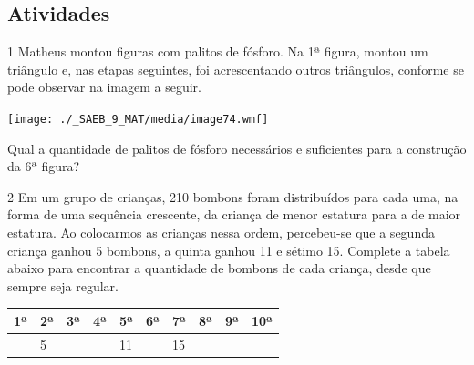 \begin{escolha}
\begin{boxmedio}
\begin{boxmedio}
{\begin{boxpeq}
\begin{boxpeq}
{\begin{boxpeq}
\begin{boxmedio}
\begin{boxmedio}
\begin{boxpeq}
\begin{boxmedio}
\begin{boxpeq}
\begin{boxpeq}
\begin{boxpeq}
\begin{boxpeq}
\begin{boxmedio}
{\begin{boxmedio}
\begin{boxmedio}
\begin{boxpeq}
\begin{boxmedio}
\begin{boxpeq}
\begin{boxpeq}
\begin{boxpeq}
\begin{escolha}
\section{Atividades}

\num{1} Matheus montou figuras com palitos de fósforo. Na 1ª figura, montou
um triângulo e, nas etapas seguintes, foi acrescentando outros triângulos,
conforme se pode observar na imagem a seguir.

\texttt{[image: ./\_SAEB\_9\_MAT/media/image74.wmf]}

Qual a quantidade de palitos de fósforo necessários e suficientes para a
construção da 6ª figura?



\num{2} Em um grupo de crianças, 210 bombons foram distribuídos
para cada uma, na forma de uma sequência crescente, da criança de menor
estatura para a de maior estatura. Ao colocarmos as crianças nessa
ordem, percebeu-se que a segunda criança ganhou 5 bombons, a quinta
ganhou 11 e sétimo 15. Complete a tabela abaixo para encontrar a
quantidade de bombons de cada criança, desde que sempre seja regular.

\begin{table}[]
\begin{tabular}{|l|l|l|l|l|l|l|l|l|l|}
\hline
\rowcolor[HTML]{CBCEFB} 
1ª & 2ª & 3ª & 4ª & 5ª & 6ª & 7ª & 8ª & 9ª & 10ª \\ \hline
 & 5 &  &  & 11 &  & 15 &  &  &  \\ \hline
\end{tabular}
\end{table}


\end{escolha}
\end{boxpeq}
\end{boxpeq}
\end{boxpeq}
\end{boxmedio}
\end{boxpeq}
\end{boxmedio}
\end{boxmedio}}
\end{boxmedio}
\end{boxpeq}
\end{boxpeq}
\end{boxpeq}
\end{boxpeq}
\end{boxmedio}
\end{boxpeq}
\end{boxmedio}
\end{boxmedio}
\end{boxpeq}}
\end{boxpeq}
\end{boxpeq}}
\end{boxmedio}
\end{boxmedio}
\end{escolha}
